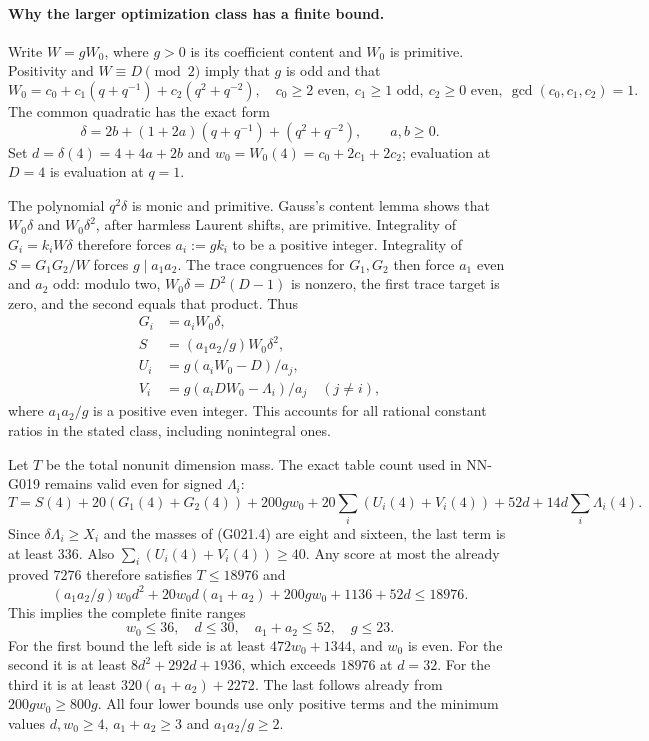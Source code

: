 \paragraph{Why the larger optimization class has a finite bound.}
Write $W=gW_0$, where $g>0$ is its coefficient content and $W_0$
is primitive. Positivity and $W\equiv D\pmod2$ imply that $g$ is
odd and that
\[
 W_0=c_0+c_1(q+q^{-1})+c_2(q^2+q^{-2}),
 \quad c_0\ge2\text{ even},\ c_1\ge1\text{ odd},\
 c_2\ge0\text{ even},\ \gcd(c_0,c_1,c_2)=1.
 \tag{G021.5}
\]
The common quadratic has the exact form
\[
 \delta=2b+(1+2a)(q+q^{-1})+(q^2+q^{-2}),\qquad a,b\ge0.
 \tag{G021.6}
\]
Set $d=\delta(4)=4+4a+2b$ and $w_0=W_0(4)=c_0+2c_1+2c_2$;
evaluation at $D=4$ is evaluation at $q=1$.

The polynomial $q^2\delta$ is monic and primitive. Gauss's content
lemma shows that $W_0\delta$ and $W_0\delta^2$, after harmless
Laurent shifts, are primitive. Integrality of $G_i=k_iW\delta$
therefore forces $a_i:=gk_i$ to be a positive integer. Integrality
of $S=G_1G_2/W$ forces $g\mid a_1a_2$. The trace congruences
for $G_1,G_2$ then force $a_1$ even and $a_2$ odd: modulo two,
$W_0\delta=D^2(D-1)$ is nonzero, the first trace target is zero,
and the second equals that product. Thus
\[
 \begin{aligned}
 G_i&=a_iW_0\delta,\\
 S&=(a_1a_2/g)W_0\delta^2,\\
 U_i&=g(a_iW_0-D)/a_j,\\
 V_i&=g(a_iDW_0-\Lambda_i)/a_j\quad(j\ne i),
 \end{aligned}                                         \tag{G021.7}
\]
where $a_1a_2/g$ is a positive even integer. This accounts for
all rational constant ratios in the stated class, including
nonintegral ones.

Let $T$ be the total nonunit dimension mass. The exact table
count used in NN-G019 remains valid even for signed $\Lambda_i$:
\[
 T=S(4)+20(G_1(4)+G_2(4))+200gw_0
   +20\sum_i(U_i(4)+V_i(4))
   +52d+14d\sum_i\Lambda_i(4).
 \tag{G021.8}
\]
Since $\delta\Lambda_i\ge X_i$ and the masses of (G021.4)
are eight and sixteen, the last term is at least $336$.
Also $\sum_i(U_i(4)+V_i(4))\ge40$. Any score at most the
already proved $7276$ therefore satisfies $T\le18976$ and
\[
 (a_1a_2/g)w_0d^2+20w_0d(a_1+a_2)
       +200gw_0+1136+52d\le18976.                     \tag{G021.9}
\]
This implies the complete finite ranges
\[
 w_0\le36,\quad d\le30,\quad a_1+a_2\le52,\quad g\le23.
 \tag{G021.10}
\]
For the first bound the left side is at least $472w_0+1344$,
and $w_0$ is even. For the second it is at least
$8d^2+292d+1936$, which exceeds $18976$ at $d=32$.
For the third it is at least $320(a_1+a_2)+2272$.
The last follows already from $200gw_0\ge800g$.
All four lower bounds use only positive terms and the minimum
values $d,w_0\ge4$, $a_1+a_2\ge3$ and $a_1a_2/g\ge2$.

